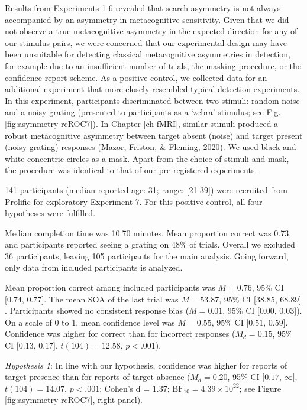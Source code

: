 \documentclass[12pt,twoside]{reedthesis}
\begin{document}
Results from Experiments 1-6 revealed that search asymmetry is not always accompanied by an asymmetry in metacognitive sensitivity. Given that we did not observe a true metacognitive asymmetry in the expected direction for any of our stimulus pairs, we were concerned that our experimental design may have been unsuitable for detecting classical metacognitive asymmetries in detection, for example due to an insufficient number of trials, the masking procedure, or the confidence report scheme. As a positive control, we collected data for an additional experiment that more closely resembled typical detection experiments. In this experiment, participants discriminated between two stimuli: random noise and a noisy grating (presented to participants as a `zebra' stimulus; see Fig. \ref{fig:asymmetry-rcROC7}). In Chapter \ref{ch-fMRI}, similar stimuli produced a robust metacognitive asymmetry between target absent (noise) and target present (noisy grating) responses (Mazor, Friston, \& Fleming, 2020). We used black and white concentric circles as a mask. Apart from the choice of stimuli and mask, the procedure was identical to that of our pre-registered experiments.

141 participants (median reported age: 31; range: {[}21-39{]}) were recruited from Prolific for exploratory Experiment 7. For this positive control, all four hypotheses were fulfilled.

Median completion time was 10.70 minutes. Mean proportion correct was 0.73, and participants reported seeing a grating on 48\% of trials. Overall we excluded 36 participants, leaving 105 participants for the main analysis. Going forward, only data from included participants is analyzed.

Mean proportion correct among included participants was \(M = 0.76\), 95\% CI \([0.74\), \(0.77]\). The mean SOA of the last trial was \(M = 53.87\), 95\% CI \([38.85\), \(68.89]\). Participants showed no consistent response bias (\(M = 0.01\), 95\% CI \([0.00\), \(0.03]\)). On a scale of 0 to 1, mean confidence level was \(M = 0.55\), 95\% CI \([0.51\), \(0.59]\). Confidence was higher for correct than for incorrect responses (\(M_d = 0.15\), 95\% CI \([0.13\), \(0.17]\), \(t(104) = 12.58\), \(p < .001\)).

\emph{Hypothesis 1}: In line with our hypothesis, confidence was higher for reports of target presence than for reports of target absence (\(M_d = 0.20\), 95\% CI \([0.17\), \(\infty]\), \(t(104) = 14.07\), \(p < .001\); Cohen's d = 1.37; \(\mathrm{BF}_{\textrm{10}} = 4.39 \times 10^{22}\); see Figure \ref{fig:asymmetry-rcROC7}, right panel).
\end{document}
